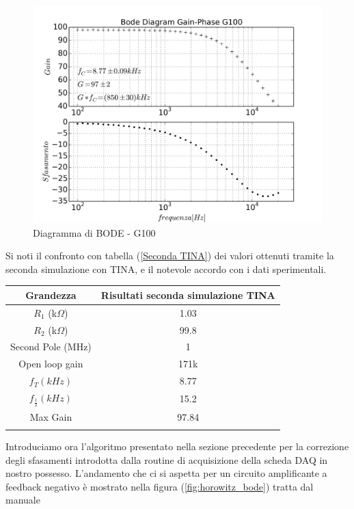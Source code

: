 \documentclass[journal, a4paper]{IEEEtran}
\begin{document}
\begin{figure}
\centering
\includegraphics[width=0.9\linewidth]{./es_8_bode_diag}
\caption{Diagramma di BODE - G100}
\label{fig:es_8_bode_diag}
\end{figure}


Si noti il confronto con tabella (\ref{Seconda TINA}) dei valori ottenuti tramite la seconda simulazione con TINA, e il notevole accordo con i dati sperimentali.\\

{
\centering
\begin{tabular}{|c|c|}
\hline 
Grandezza & Risultati seconda simulazione TINA\\ 
\hline 
$R_1$ (k$\Omega$)& 1.03  \\ 
\hline 
$R_2$ (k$\Omega$) & 99.8 \\ 
\hline 
Second Pole (MHz) & 1 \\ 
\hline
Open loop gain & 171k\\
\hline 
$f_T (kHz)$ & 8.77 \\ 
\hline 
$f_{\frac{1}{2}} (kHz)$ & 15.2 \\ 
\hline 
Max Gain & 97.84 \\ 
\hline
\label{Seconda TINA}
\end{tabular}

}

Introduciamo ora l'algoritmo presentato nella sezione precedente per la correzione degli sfasamenti introdotta dalla routine di acquisizione della scheda DAQ in nostro possesso. L'andamento che ci si aspetta per un circuito amplificante a feedback negativo è mostrato nella figura (\ref{fig:horowitz_bode}) tratta dal manuale %
\end{document}
